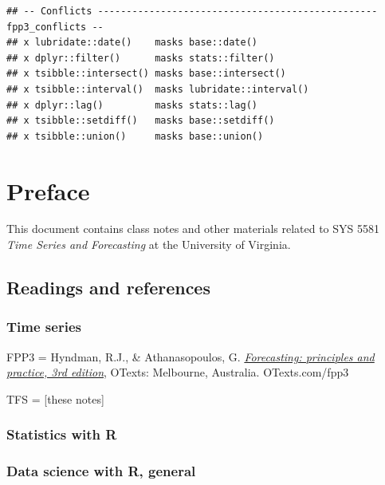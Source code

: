 \documentclass[
]{book}
\begin{document}
\begin{verbatim}
## -- Conflicts ------------------------------------------------- fpp3_conflicts --
## x lubridate::date()    masks base::date()
## x dplyr::filter()      masks stats::filter()
## x tsibble::intersect() masks base::intersect()
## x tsibble::interval()  masks lubridate::interval()
## x dplyr::lag()         masks stats::lag()
## x tsibble::setdiff()   masks base::setdiff()
## x tsibble::union()     masks base::union()
\end{verbatim}

\hypertarget{preface-1}{%
\chapter*{Preface}\label{preface-1}}

This document contains class notes and other materials related to SYS 5581 \emph{Time Series and Forecasting} at the University of Virginia.

\hypertarget{readings-and-references}{%
\section*{Readings and references}\label{readings-and-references}}

\hypertarget{time-series}{%
\subsection*{Time series}\label{time-series}}

FPP3 = Hyndman, R.J., \& Athanasopoulos, G. \citeyearpar{robjhyndmanForecastingPrinciplesPractice2021} \href{https://otexts.com/fpp3/}{\emph{Forecasting: principles and practice, 3rd edition}}, OTexts: Melbourne, Australia. OTexts.com/fpp3

TFS = {[}these notes{]}

\hypertarget{statistics-with-r}{%
\subsection*{Statistics with R}\label{statistics-with-r}}

\hypertarget{data-science-with-r-general}{%
\subsection*{Data science with R, general}\label{data-science-with-r-general}}
\end{document}
